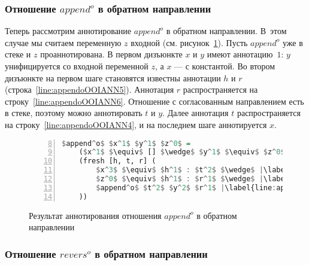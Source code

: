 
\subsubsection{Отношение $append^o$ в обратном направлении}

Теперь рассмотрим аннотирование $append^o$ в обратном направлении.
В~этом случае мы считаем переменную $z$ входной (см. рисунок~\ref{lst:appendoOOIANN}).
Пусть $append^o$ уже в стеке и $z$ проаннотирована.
В первом дизъюнкте $x$ и $y$ имеют аннотацию~$1$: $y$ унифицируется со входной переменной $z$, а $x$ --- с константой.
Во втором дизъюнкте на первом шаге становятся известны аннотации $h$ и $r$ (строка~\ref{line:appendoOOIANN5}).
Аннотация $r$ распространяется на строку~\ref{line:appendoOOIANN6}. 
Отношение с согласованным направлением есть в стеке, поэтому можно аннотировать $t$ и $y$.
Далее аннотация $t$ распространяется на строку~\ref{line:appendoOOIANN4}, и на последнем шаге аннотируется $x$. 

\begin{figure}[h!]
  \begin{center}
  \begin{minipage}{0.4\textwidth}
  \begin{lstlisting}[language=Haskell, frame=single, numbers=left,numberstyle=\small, firstnumber=8, escapechar=|]
  $append^o$ $x^1$ $y^1$ $z^0$ =
    ($x^1$ $\equiv$ [] $\wedge$ $y^1$ $\equiv$ $z^0$) $\vee$ |\label{line:appendoOOIANN2}|
    (fresh [h, t, r] (
        $x^3$ $\equiv$ $h^1$ : $t^2$ $\wedge$ |\label{line:appendoOOIANN4}|
        $z^0$ $\equiv$ $h^1$ : $r^1$ $\wedge$ |\label{line:appendoOOIANN5}|
        $append^o$ $t^2$ $y^2$ $r^1$ |\label{line:appendoOOIANN6}|
    ))
    \end{lstlisting}
  \end{minipage}
  \end{center}
  \caption{Результат аннотирования отношения $append^o$ в обратном направлении}
  \label{lst:appendoOOIANN}
\end{figure}


\subsubsection{Отношение $revers^o$ в обратном направлении}

